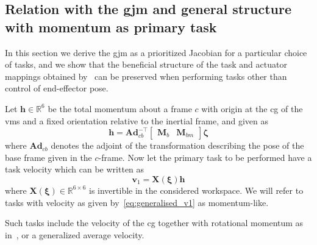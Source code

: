 \documentclass[../main.tex]{subfiles}
\begin{document}
\subsection{Relation with the \gls{gjm} and general structure with momentum as primary task}\label{sec:gjm_structure}\vspace{-10pt}
In this section we derive the \gls{gjm} as a prioritized Jacobian for a particular choice of tasks, and we show that the beneficial structure of the task and actuator mappings obtained by~\cite{Giordano2018} can be preserved when performing tasks other than control of end-effector pose.

Let $\bm{h} \in \mathbb{R}^6$ be the total momentum about a frame $c$ with origin at the \gls{cg} of the \gls{vms} and a fixed orientation relative to the inertial frame, and given as~\citep{Giordano2018}
\begin{equation}\label{eq:h}
    \bm{h} = \bm{Ad}_{cb}^{-\top} \begin{bmatrix}
        \bm{M}_b & \bm{M}_{bm}
    \end{bmatrix} \bm{\zeta}
\end{equation}
where $\bm{Ad}_{cb}$ denotes the adjoint of the transformation describing the pose of the base frame given in the $c$-frame. Now let the primary task to be performed have a task velocity which can be written as
\begin{equation}\label{eq:generalised_v1}
    \bm{v}_1 = \bm{X}(\bm{\xi}) \bm{h} 
\end{equation}
where $\bm{X}(\bm{\xi}) \in \mathbb{R}^{6\times 6}$ is invertible in the considered workspace. We will refer to tasks with velocity as given by~\eqref{eq:generalised_v1} as momentum-like.
\begin{remark}
    Such tasks include the velocity of the \gls{cg} together with rotational momentum as in~\cite{Giordano2018}, or a generalized average velocity.%
\end{remark}\vspace{-5pt}
\end{document}

